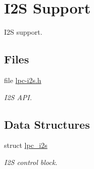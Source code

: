\hypertarget{group__lpc__i2s}{}\section{I2S Support}
\label{group__lpc__i2s}


I2S support.  


\subsection*{Files}
\begin{DoxyCompactItemize}
\item 
file \mbox{\hyperlink{lpc-i2s_8h}{lpc-\/i2s.\+h}}
\begin{DoxyCompactList}\small\item\em I2S A\+PI. \end{DoxyCompactList}\end{DoxyCompactItemize}
\subsection*{Data Structures}
\begin{DoxyCompactItemize}
\item 
struct \mbox{\hyperlink{structlpc__i2s}{lpc\+\_\+i2s}}
\begin{DoxyCompactList}\small\item\em I2S control block. \end{DoxyCompactList}\end{DoxyCompactItemize}

